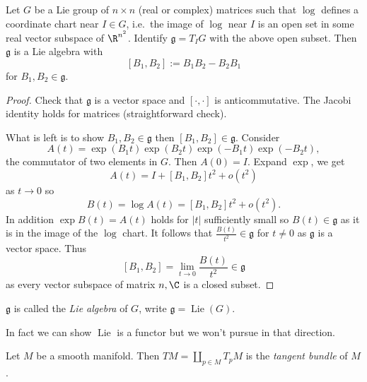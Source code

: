 \documentclass[a4paper]{article}
\DeclareMathOperator{\Lie}{Lie} %
\begin{document}
\begin{theorem}
  Let \(G\) be a Lie group of \(n \times n\) (real or complex) matrices such that \(\log\) defines a coordinate chart near \(I \in G\), i.e.\ the image of \(\log\) near \(I\) is an open set in some real vector subspace of \(\R^{n^2}\). Identify \(\mathfrak g = T_IG\) with the above open subset. Then \(\mathfrak g\) is a Lie algebra with
  \[
    [B_1, B_2] := B_1B_2 - B_2B_1
  \]
  for \(B_1, B_2 \in \mathfrak g\).
\end{theorem}

\begin{proof}
  Check that \(\mathfrak g\) is a vector space and \([\cdot, \cdot]\) is anticommutative. The Jacobi identity holds for matrices (straightforward check).

  What is left is to show \(B_1, B_2 \in \mathfrak g\) then \([B_1, B_2] \in \mathfrak g\). Consider
  \[
    A(t) = \exp (B_1 t) \exp (B_2 t) \exp(-B_1t) \exp (-B_2t),
  \]
  the commutator of two elements in \(G\). Then \(A(0) = I\). Expand \(\exp\), we get
  \[
    A(t) = I + [B_1, B_2] t^2 + o(t^2)
  \]
  as \(t \to 0\) so
  \[
    B(t) = \log A(t) = [B_1, B_2] t^2 + o(t^2).
  \]
  In addition \(\exp B(t) = A(t)\) holds for \(|t|\) sufficiently small so \(B(t) \in \mathfrak g\) as it is in the image of the \(\log\) chart. It follows that \(\frac{B(t)}{t^2} \in \mathfrak g\) for \(t \neq 0\) as \(\mathfrak g\) is a vector space. Thus
  \[
    [B_1, B_2] = \lim_{t \to 0} \frac{B(t)}{t^2} \in \mathfrak g
  \]
  as every vector subspace of matrix \(n, \C\) is a closed subset.
\end{proof}


\begin{definition}
  \(\mathfrak g\) is called the \emph{Lie algebra} of \(G\), write \(\mathfrak g = \Lie(G)\).
\end{definition}

In fact we can show \(\Lie\) is a functor but we won't pursue in that direction.

\begin{definition}
  Let \(M\) be a smooth manifold. Then \(TM = \coprod_{p \in M} T_pM\) is the \emph{tangent bundle} of \(M\).
\end{definition}
\end{document}
